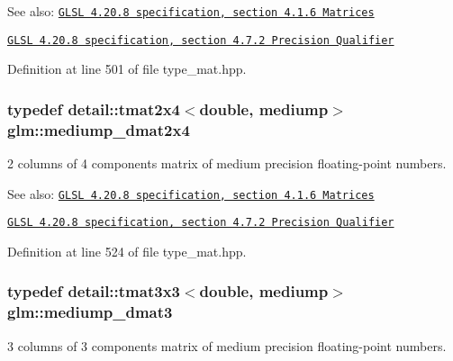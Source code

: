 \begin{Desc}
\item[See also:]\href{http://www.opengl.org/registry/doc/GLSLangSpec.4.20.8.pdf}{\tt GLSL 4.20.8 specification, section 4.1.6 Matrices} 

\href{http://www.opengl.org/registry/doc/GLSLangSpec.4.20.8.pdf}{\tt GLSL 4.20.8 specification, section 4.7.2 Precision Qualifier} \end{Desc}


Definition at line 501 of file type\_\-mat.hpp.\hypertarget{group__core__precision_gdb60bf60ef2b8da4a28a372b2bcca3a3}{
\subsubsection[mediump\_\-dmat2x4]{\setlength{\rightskip}{0pt plus 5cm}typedef detail::tmat2x4$<$double, mediump$>$ {\bf glm::mediump\_\-dmat2x4}}}
\label{group__core__precision_gdb60bf60ef2b8da4a28a372b2bcca3a3}


2 columns of 4 components matrix of medium precision floating-point numbers.

\begin{Desc}
\item[See also:]\href{http://www.opengl.org/registry/doc/GLSLangSpec.4.20.8.pdf}{\tt GLSL 4.20.8 specification, section 4.1.6 Matrices} 

\href{http://www.opengl.org/registry/doc/GLSLangSpec.4.20.8.pdf}{\tt GLSL 4.20.8 specification, section 4.7.2 Precision Qualifier} \end{Desc}


Definition at line 524 of file type\_\-mat.hpp.\hypertarget{group__core__precision_g80600af2c1ca11ead6123777185c372d}{
\subsubsection[mediump\_\-dmat3]{\setlength{\rightskip}{0pt plus 5cm}typedef detail::tmat3x3$<$double, mediump$>$ {\bf glm::mediump\_\-dmat3}}}
\label{group__core__precision_g80600af2c1ca11ead6123777185c372d}


3 columns of 3 components matrix of medium precision floating-point numbers.

